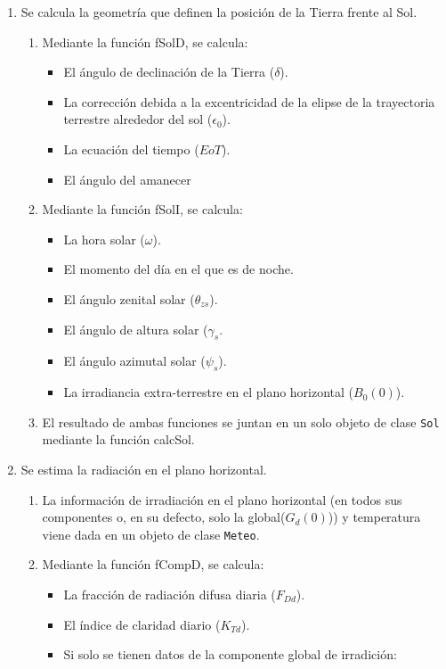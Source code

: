 \begin{enumerate}
\item Se calcula la geometría que definen la posición de la Tierra frente al Sol.
\begin{enumerate}
\item Mediante la función fSolD, se calcula:
\begin{itemize}
\item El ángulo de declinación de la Tierra (\(\delta\)).
\item La corrección debida a la excentricidad de la elipse de la trayectoria terrestre alrededor del sol (\(\epsilon_0\)).
\item La ecuación del tiempo (\(EoT\)).
\item El ángulo del amanecer
\end{itemize}
\item Mediante la función fSolI, se calcula:
\begin{itemize}
\item La hora solar (\(\omega\)).
\item El momento del día en el que es de noche.
\item El ángulo zenital solar (\(\theta_{zs}\)).
\item El ángulo de altura solar (\(\gamma_s\).
\item El ángulo azimutal solar (\(\psi_s\)).
\item La irradiancia extra-terrestre en el plano horizontal (\(B_0(0)\)).
\end{itemize}
\item El resultado de ambas funciones se juntan en un solo objeto de clase \texttt{Sol} mediante la función calcSol.
\end{enumerate}
\item Se estima la radiación en el plano horizontal.
\begin{enumerate}
\item La información de irradiación en el plano horizontal (en todos sus componentes o, en su defecto, solo la global(\(G_d(0)\))) y temperatura viene dada en un objeto de clase \texttt{Meteo}.
\item Mediante la función fCompD, se calcula:
\begin{itemize}
\item La fracción de radiación difusa diaria (\(F_{Dd}\)).
\item El índice de claridad diario (\(K_{Td}\)).
\item Si solo se tienen datos de la componente global de irradición:

\end{itemize}
\end{enumerate}
\end{enumerate}
